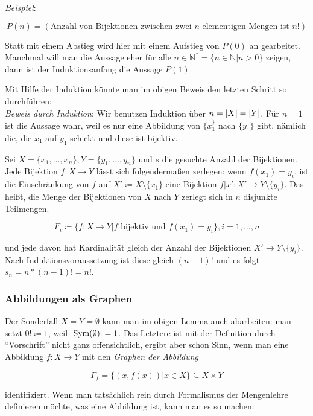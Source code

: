 \documentclass{article}
\begin{document}
\emph{Beispiel}:

\[
  P(n) = (\text{Anzahl von Bijektionen zwischen zwei $n$-elementigen Mengen ist $n!$})
\]

Statt mit einem Abstieg wird hier mit einem Aufstieg von $P(0)$ an gearbeitet.
Manchmal will man die Aussage eher für alle $n \in \mathbb{N}^* = \{ n \in \mathbb{N} | n > 0 \}$ zeigen,
dann ist der Induktionsanfang die Aussage $P(1)$.

Mit Hilfe der Induktion könnte man im obigen Beweis den letzten Schritt so durchführen: \\

\emph{Beweis durch Induktion}: Wir benutzen Induktion über $n = \abs{X} = \abs{Y}$.
Für $n = 1$ ist die Aussage wahr, weil es nur eine Abbildung von $\{ x_1^\}$ nach $\{ y_1 \}$ gibt,
nämlich die, die $x_1$ auf $y_1$ schickt und diese ist bijektiv.

Sei $X = \{ x_1, \ldots, x_n\}, Y = \{ y_1, \ldots, y_n \}$ und $s$ die gesuchte Anzahl der Bijektionen.
Jede Bijektion $f \colon X \to Y$ lässt sich folgendermaßen zerlegen: wenn $f(x_1) = y_i$, ist
die Einschränkung von $f$ auf $X' \coloneqq X \setminus \{ x_1 \}$ eine Bijektion
$f|x' \colon X' \to Y \setminus \{ y_i \}$. Das heißt, die Menge der Bijektionen von $X$ nach $Y$ zerlegt sich in $n$
disjunkte Teilmengen.

\[
  F_i \coloneqq \{ f \colon X \to Y | f \text{ bijektiv und } f(x_1) = y_i \},  i = 1, \ldots, n
\]

und jede davon hat Kardinalität gleich der Anzahl der Bijektionen $X' \to Y \setminus \{ y_i \}$.
Nach Induktionsvoraussetzung ist diese gleich $(n - 1)!$ und es folgt $s_n = n * (n - 1)! = n!$.

\subsubsection*{Abbildungen als Graphen}

Der Sonderfall $X = Y = \emptyset$ kann man im obigen Lemma auch abarbeiten: man setzt $0! \coloneqq 1$,
weil $\abs{\text{Sym}(\emptyset)} = 1$. Das Letztere ist mit der Definition durch ``Vorschrift'' nicht
ganz offensichtlich, ergibt aber schon Sinn, wenn man eine Abbildung $f \colon X \to Y$ mit den
\emph{Graphen der Abbildung}

\[
  \Gamma_f = \{ (x, f(x)) | x \in X \} \subseteq X \times Y 
\]

identifiziert. Wenn man tatsächlich rein durch Formalismus der Mengenlehre definieren möchte, was eine
Abbildung ist, kann man es so machen: \\
\end{document}
